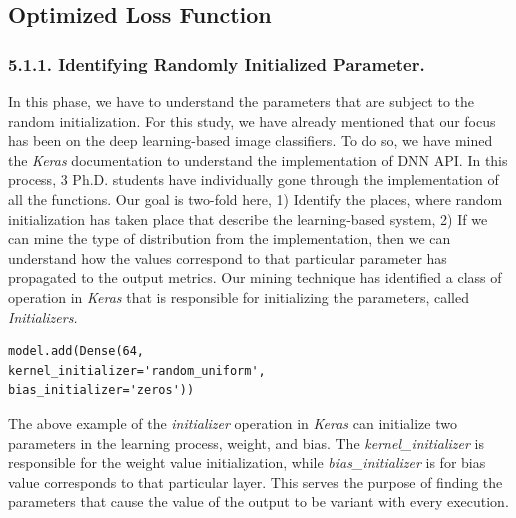 \subsection{Optimized Loss Function}
\subsubsection{5.1.1. Identifying Randomly Initialized Parameter.}
In this phase, we have to understand the parameters that are subject to the random initialization. For this study, we have already mentioned that our focus has been on the deep learning-based image classifiers. To do so, we have mined the \emph{Keras} documentation to understand the implementation of DNN API. In this process, 3 Ph.D. students have individually gone through the implementation of all the functions. Our goal is two-fold here, 1) Identify the places, where random initialization has taken place that describe the learning-based system, 2) If we can mine the type of distribution from the implementation, then we can understand how the values correspond to that particular parameter has propagated to the output metrics. Our mining technique has identified a class of operation in \emph{Keras} that is responsible for initializing the parameters, called \emph{Initializers.} 
\begin{lstlisting}
model.add(Dense(64,
kernel_initializer='random_uniform',
bias_initializer='zeros'))
\end{lstlisting}
The above example of the \emph{initializer} operation in \emph{Keras} can initialize two parameters in the learning process, weight, and bias. The \emph{kernel\_initializer} is responsible for the weight value initialization, while \emph{bias\_initializer} is for bias value corresponds to that particular layer. This serves the purpose of finding the parameters that cause the value of the output to be variant with every execution. 

